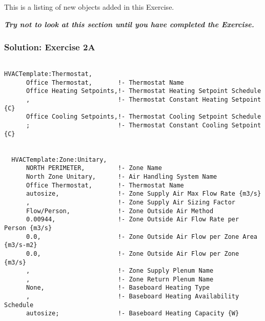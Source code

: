 This is a listing of new objects added in this Exercise.

\textbf{\emph{Try not to look at this section until you have completed the Exercise.}}

\subsubsection{Solution: Exercise 2A}\label{solution-exercise-2a}

\begin{lstlisting}

HVACTemplate:Thermostat,
      Office Thermostat,       !- Thermostat Name
      Office Heating Setpoints,!- Thermostat Heating Setpoint Schedule
      ,                        !- Thermostat Constant Heating Setpoint {C}
      Office Cooling Setpoints,!- Thermostat Cooling Setpoint Schedule
      ;                        !- Thermostat Constant Cooling Setpoint {C}


  HVACTemplate:Zone:Unitary,
      NORTH PERIMETER,         !- Zone Name
      North Zone Unitary,      !- Air Handling System Name
      Office Thermostat,       !- Thermostat Name
      autosize,                !- Zone Supply Air Max Flow Rate {m3/s}
      ,                        !- Zone Supply Air Sizing Factor
      Flow/Person,             !- Zone Outside Air Method
      0.00944,                 !- Zone Outside Air Flow Rate per Person {m3/s}
      0.0,                     !- Zone Outside Air Flow per Zone Area {m3/s-m2}
      0.0,                     !- Zone Outside Air Flow per Zone {m3/s}
      ,                        !- Zone Supply Plenum Name
      ,                        !- Zone Return Plenum Name
      None,                    !- Baseboard Heating Type
      ,                        !- Baseboard Heating Availability Schedule
      autosize;                !- Baseboard Heating Capacity {W}



\end{lstlisting}

